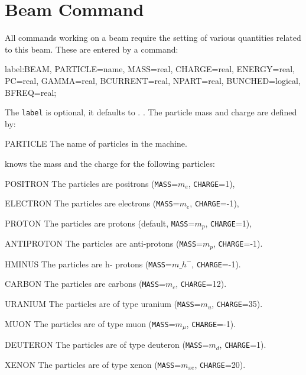 

\chapter{Beam Command}
\label{chp:beam}
All \opal commands working on a beam require the setting of various
quantities related to this beam.
These are entered by a  command:
\begin{example}
label:BEAM, PARTICLE=name, MASS=real, CHARGE=real,
      ENERGY=real, PC=real, GAMMA=real, BCURRENT=real,
       NPART=real, BUNCHED=logical, BFREQ=real;
\end{example}
The \texttt{label} is optional, it defaults to .
. The particle mass and charge are defined by:
\begin{kdescription}
\item[PARTICLE]
  The name of particles in the machine.
\end{kdescription}

\opal knows the mass and the charge for the following particles:
\begin{kdescription}
  \item[POSITRON]
    The particles are positrons (\texttt{MASS}=$m_e$,
    \texttt{CHARGE}=1),

  \item[ELECTRON]
    The particles are electrons (\texttt{MASS}=$m_e$,
    \texttt{CHARGE}=-1),

  \item[PROTON]
    The particles are protons (default, \texttt{MASS}=$m_p$,
    \texttt{CHARGE}=1),

  \item[ANTIPROTON]
    The particles are anti-protons (\texttt{MASS}=$m_p$,
    \texttt{CHARGE}=-1).

  \item[HMINUS]
    The particles are h- protons (\texttt{MASS}=$m\_{h^{-}}$,
    \texttt{CHARGE}=-1).

  \item[CARBON]
    The particles are carbons (\texttt{MASS}=$m_c$,
    \texttt{CHARGE}=12).

  \item[URANIUM]
    The particles are of type uranium (\texttt{MASS}=$m_u$,
    \texttt{CHARGE}=35).

  \item[MUON]
    The particles are of type muon (\texttt{MASS}=$m_\mu$,
    \texttt{CHARGE}=-1).

  \item[DEUTERON]
    The particles are of type deuteron (\texttt{MASS}=$m_d$,
    \texttt{CHARGE}=1).

  \item[XENON]
    The particles are of type xenon (\texttt{MASS}=$m_{xe}$,
    \texttt{CHARGE}=20).
\end{kdescription}

